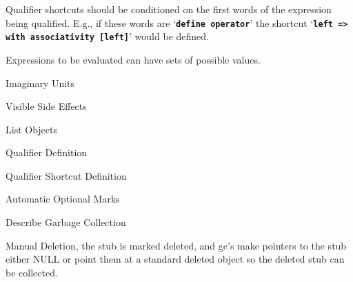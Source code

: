 \documentclass[12pt]{article}
\newcommand{\TT}[1]{{\tt \bfseries #1}}
\begin{document}
Qualifier shortcuts should be conditioned on the first words of
the expression being qualified.  E.g., if these words are
`\TT{define operator}' the shortcut `\TT{left => }\TT{with
associativity [left]}' would be defined.

Expressions to be evaluated can have sets of possible values.

Imaginary Units\label{IMAGINARY-UNITS}

Visible Side Effects\label{VISIBLE-SIDE-EFFECTS}

List Objects\label{LIST}

Qualifier Definition\label{QUALIFIER-DEFINITION}

Qualifier Shortcut Definition\label{QUALIFIER-SHORTCUT-DEFINITION}

Automatic Optional Marks\label{AUTOMATIC-OPTIONAL-MARKS}

Describe Garbage Collection\label{GARBAGE-COLLECTION}

Manual Deletion\label{MANUAL-DELETION}, the stub is marked deleted,
and gc's make pointers to the stub either NULL or point them at
a standard deleted object so the deleted stub can be collected.




\printindex
\end{document}
